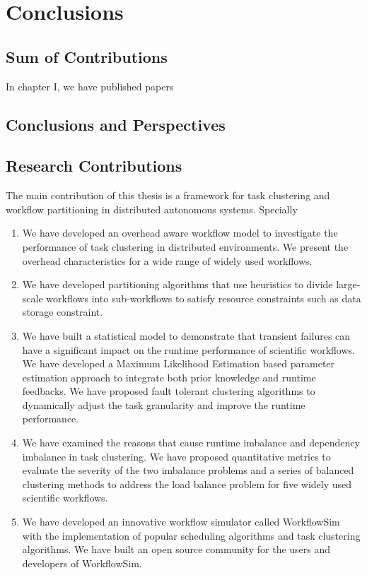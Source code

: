 \chapter{Conclusions}

\section{Sum of Contributions}

In chapter I, we have published papers

\section{Conclusions and Perspectives}

\section{Research Contributions}

The main contribution of this thesis is a framework for task clustering and workflow partitioning in distributed autonomous systems. Specially
\begin{enumerate}
\item We have developed an overhead aware workflow model to investigate the performance of task clustering in distributed environments. We present the overhead characteristics for a wide range of widely used workflows.
\item We have developed partitioning algorithms that use heuristics to divide large-scale workflows into sub-workflows to satisfy resource constraints such as data storage constraint. 
\item We have built a statistical model to demonstrate that transient failures can have a significant impact on the runtime performance of scientific workflows. We have developed a Maximum Likelihood Estimation based parameter estimation approach to integrate both prior knowledge and runtime feedbacks. We have proposed fault tolerant clustering algorithms to dynamically adjust the task granularity and improve the runtime performance. 
\item We have examined the reasons that cause runtime imbalance and dependency imbalance in task clustering. We have proposed quantitative metrics to evaluate the severity of the two imbalance problems and a series of balanced clustering methods to address the load balance problem for five widely used scientific workflows. 
\item We have developed an innovative workflow simulator called WorkflowSim with the implementation of popular scheduling algorithms and task clustering algorithms. 
We have built an open source community for the users and developers of WorkflowSim. 
\end{enumerate}
 